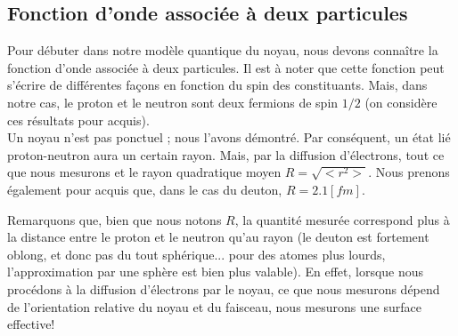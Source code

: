 \subsection{Fonction d'onde associée à deux particules}


Pour débuter dans notre modèle quantique du noyau, nous devons connaître la fonction d'onde associée à deux particules. Il est à noter que cette fonction peut s'écrire de différentes façons en fonction du spin des constituants. Mais, dans notre cas, le proton et le neutron sont deux fermions de spin $1/2$ (on considère ces résultats pour acquis).\\

Un noyau n'est pas ponctuel ; nous l'avons démontré. Par conséquent, un état lié proton-neutron aura un certain rayon. Mais, par la diffusion d'électrons, tout ce que nous mesurons et le rayon quadratique moyen $R = \sqrt{<r^2>}$. Nous prenons également pour acquis que, dans le cas du deuton, $R=2.1 [fm]$.

Remarquons que, bien que nous notons $R$, la quantité mesurée correspond plus à la distance entre le proton et le neutron qu'au rayon (le deuton est fortement oblong, et donc pas du tout sphérique... pour des atomes plus lourds, l'approximation par une sphère est bien plus valable). En effet, lorsque nous procédons à la diffusion d'électrons par le noyau, ce que nous mesurons dépend de l'orientation relative du noyau et du faisceau, nous mesurons une surface effective!

